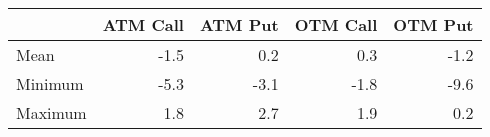 \begin{tabular}{lrrrr}
\hline
         &   ATM Call &   ATM Put &   OTM Call &   OTM Put \\
\hline
 Mean    &       -1.5 &       0.2 &        0.3 &      -1.2 \\
 Minimum &       -5.3 &      -3.1 &       -1.8 &      -9.6 \\
 Maximum &        1.8 &       2.7 &        1.9 &       0.2 \\
\hline
\end{tabular}